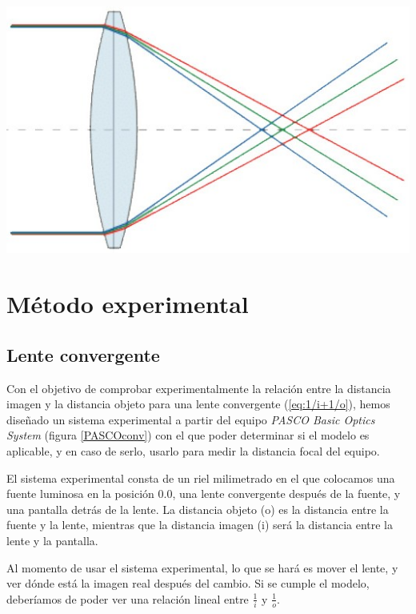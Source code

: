 \documentclass[a4paper,12pt]{article}
\newenvironment{Figure}
  {\par\medskip\noindent\minipage{\linewidth}}
  {\endminipage\par\medskip}
\begin{document}
\begin{multicols*}{2}
        \begin{Figure}
            \centering
            \includegraphics[width=0.7\linewidth]{ab cromatica.jpg}
            \label{f: abcro}
        \end{Figure}

\newpage

\section*{Método experimental}

    \subsection*{Lente convergente}
    
        Con el objetivo de comprobar experimentalmente la relación entre la distancia imagen y la distancia objeto para una lente convergente (\ref{eq:1/i+1/o}), hemos diseñado un sistema experimental a partir del equipo \emph{PASCO Basic Optics System} (figura \ref{PASCOconv}) con el que poder determinar si el modelo es aplicable, y en caso de serlo, usarlo para medir la distancia focal del equipo.

        El sistema experimental consta de un riel milimetrado en el que colocamos una fuente luminosa en la posición 0.0, una lente convergente después de la fuente, y una pantalla detrás de la lente. La distancia objeto (o) es la distancia entre la fuente y la lente, mientras que la distancia imagen (i) será la distancia entre la lente y la pantalla.

        Al momento de usar el sistema experimental, lo que se hará es mover el lente, y ver dónde está la imagen real después del cambio. Si se cumple el modelo, deberíamos de poder ver una relación lineal entre $\frac{1}{i}$ y $\frac{1}{o}$.


\end{multicols*}
\end{document}
